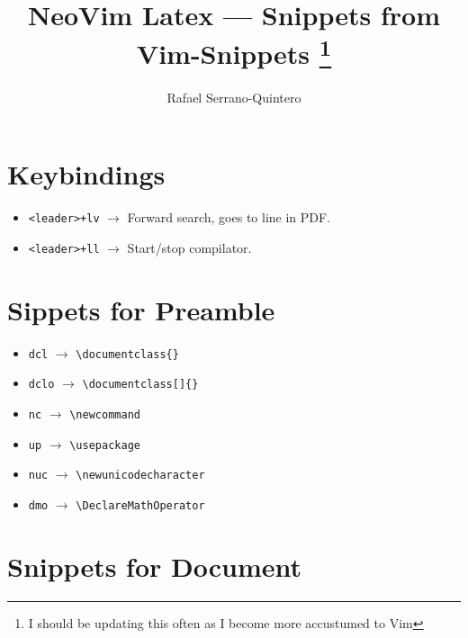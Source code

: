 \documentclass[a4paper,11pt]{article}
\title{\textbf{NeoVim Latex --- Snippets from Vim-Snippets}
\thanks{I should be updating this often as I become more accustumed to Vim}}
\author{Rafael Serrano-Quintero}
\begin{document}
\maketitle	

\section{Keybindings}

\begin{itemize}
  \item \verb|<leader>+lv| $\rightarrow$ Forward search, goes to line in PDF.
  \item \verb|<leader>+ll| $\rightarrow$ Start/stop compilator.
\end{itemize}

\section{Sippets for Preamble}

\begin{itemize}
	\item \verb|dcl| $\rightarrow$ \verb|\documentclass{}|
	\item \verb|dclo| $\rightarrow$ \verb|\documentclass[]{}|
	\item \verb|nc| $\rightarrow$ \verb|\newcommand|
	\item \verb|up| $\rightarrow$ \verb|\usepackage| 
	\item \verb|nuc| $\rightarrow$ \verb|\newunicodecharacter|
	\item \verb|dmo| $\rightarrow$ \verb|\DeclareMathOperator|
\end{itemize}

\section{Snippets for Document}
\end{document}
